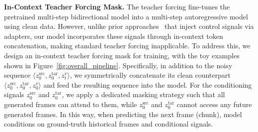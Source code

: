 \noindent
\textbf{In-Context Teacher Forcing Mask.}
% 
The teacher forcing fine-tunes the pretrained multi-step bidirectional model into a multi-step autoregressive model using clean data.
% 
However, unlike prior approaches~\cite{huang2025live,zhuang2025flashvsr,shin2025motionstream} that inject control signals via adapters, our model incorporates these signals through in-context token concatenation, making standard teacher forcing inapplicable.
To address this, we design an in-context teacher forcing mask for training, with the toy examples shown in Figure~\ref{fig:overall_pipeline}.
% 
Specifically, in addition to the noisy sequence $\langle z^{\text{src}}_0, z^{\text{tar}}_0, z^{v}_t \rangle$, we symmetrically concatenate its clean counterpart $\langle z^{\text{src}}_0, z^{\text{tar}}_0, z^{v}_0 \rangle$ and feed the resulting sequence into the model.
% 
For the conditioning signals $z^{\text{src}}_0$ and $z^{\text{tar}}_0$, we apply a dedicated masking strategy such that all generated frames can attend to them, while $z^{\text{src}}_0$ and $z^{\text{tar}}_0$ cannot access any future generated frames.
% 
In this way, when predicting the next frame (chunk), model conditions on ground-truth historical frames and conditional signals.



